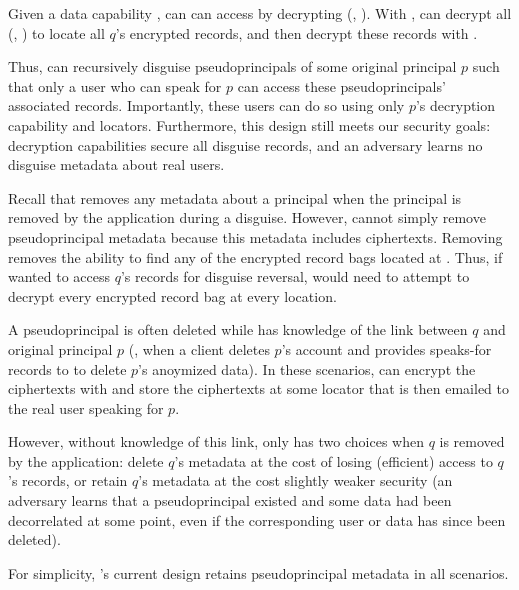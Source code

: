 Given a data capability , \sys can can access  by decrypting \enc(,
).
%
With , \sys can decrypt all \enc(, ) to locate all $q$'s encrypted
records, and then decrypt these records with . 

Thus, \sys can recursively disguise pseudoprincipals of some original principal $p$ such that only a
user who can speak for $p$ can access these pseudoprincipals' associated records.
Importantly, these users can do so using only $p$'s decryption capability and locators.
Furthermore, this design still meets our security goals: decryption capabilities secure all disguise
records, and an adversary learns no disguise metadata about real users.


Recall that \sys removes any metadata about a principal when the principal is removed by the
application during a disguise.
However, \sys cannot simply remove pseudoprincipal metadata because this metadata includes 
ciphertexts. Removing  removes the ability to find any of the encrypted record bags
located at . Thus, if \sys wanted to access $q$'s records for \eg disguise reversal, \sys
would need to attempt to decrypt every encrypted record bag at every location.

A pseudoprincipal is often deleted while \sys has knowledge of the link between $q$ and
original principal $p$ (\eg, when a client deletes $p$'s account and provides speaks-for records
to \sys to delete $p$'s anoymized data). In these scenarios, \sys can encrypt the
 ciphertexts with  and store the ciphertexts at some locator that is then emailed
to the real user speaking for $p$.

However, without knowledge of this link, \sys only has two choices when $q$ is removed by the
application: delete $q$'s metadata at the cost of losing (efficient) access to $q$'s records, or
retain $q$'s metadata at the cost slightly weaker security (an adversary learns that a
pseudoprincipal existed and some data had been decorrelated at some point, even if the corresponding
user or data has since been deleted).

For simplicity, \sys's current design retains pseudoprincipal metadata in all scenarios.

